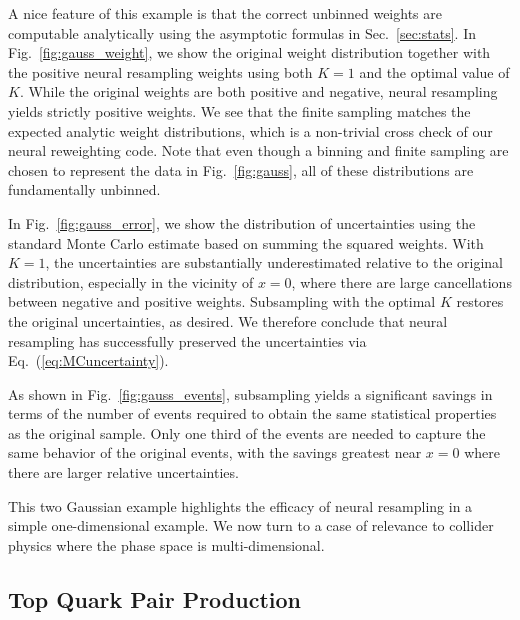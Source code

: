 \documentclass[prd,twocolumn,superscriptaddress,longbibliography,preprintnumbers,floatfix,nofootinbib]{revtex4-1}
\DeclareRobustCommand{\Sec}[1]{Sec.~\ref{sec:#1}}
\DeclareRobustCommand{\Fig}[1]{Fig.~\ref{fig:#1}}
\DeclareRobustCommand{\Eq}[1]{Eq.~(\ref{eq:#1})}
\begin{document}
A nice feature of this example is that the correct unbinned weights are computable analytically using the asymptotic formulas in \Sec{stats}.
%
In \Fig{gauss_weight}, we show the original weight distribution together with the positive neural resampling weights using both $K = 1$ and the optimal value of $K$.
%
While the original weights are both positive and negative, neural resampling yields strictly positive weights.
%
We see that the finite sampling matches the expected analytic weight distributions, which is a non-trivial cross check of our neural reweighting code.
%
Note that even though a binning and finite sampling are chosen to represent the data in \Fig{gauss}, all of these distributions are fundamentally unbinned.


In \Fig{gauss_error}, we show the distribution of uncertainties using the standard Monte Carlo estimate based on summing the squared weights.
%
With $K=1$, the uncertainties are substantially underestimated relative to the original distribution, especially in the vicinity of $x = 0$, where there are large cancellations between negative and positive weights.
%
Subsampling with the optimal $K$ restores the original uncertainties, as desired.
%
We therefore conclude that neural resampling has successfully preserved the uncertainties via \Eq{MCuncertainty}.


As shown in \Fig{gauss_events}, subsampling yields a significant savings in terms of the number of events required to obtain the same statistical properties as the original sample.
%
Only one third of the events are needed to capture the same behavior of the original events, with the savings greatest near $x = 0$ where there are larger relative uncertainties.


This two Gaussian example highlights the efficacy of neural resampling in a simple one-dimensional example.
%
We now turn to a case of relevance to collider physics where the phase space is multi-dimensional.


\subsection{Top Quark Pair Production}
\label{sec:ttbar}
\end{document}
